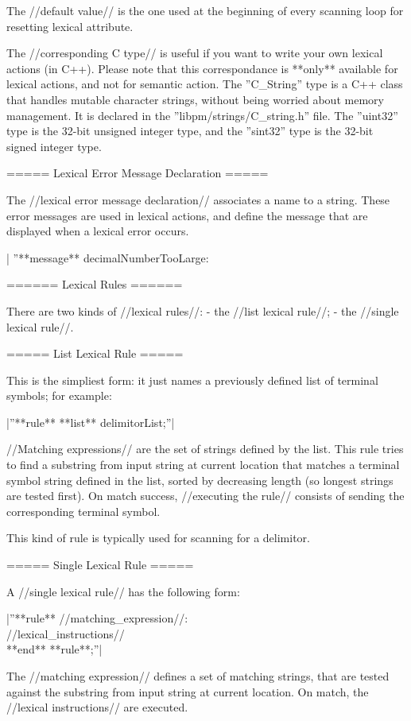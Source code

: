 {The //default value// is the one used at the beginning of every scanning loop for resetting lexical attribute.

The //corresponding C type// is useful if you want to write your own lexical actions (in C++). Please note that this correspondance is **only** available for lexical actions, and not for semantic action. The ''C\_String'' type is a C++ class that handles mutable character strings, without being worried about memory management. It is declared in the ''libpm/strings/C\_string.h'' file. The ''uint32'' type is the 32-bit unsigned integer type, and the ''sint32'' type is the 32-bit signed integer type. 
 

===== Lexical Error Message Declaration =====

The //lexical error message declaration// associates a name to a string. These error messages are used in lexical actions, and define the message that are displayed when a lexical error occurs.

|  ''**message** decimalNumberTooLarge: %

 

====== Lexical Rules ======

There are two kinds of //lexical rules//:
  - the //list lexical rule//;
  - the //single lexical rule//.

===== List Lexical Rule =====

This is the simpliest form: it just names a previously defined list of terminal symbols; for example:

|''**rule** **list** delimitorList;''|

//Matching expressions// are the set of strings defined by the list. This rule tries to find a substring from input string at current location that matches a terminal symbol string defined in the list, sorted by decreasing length (so longest strings are tested first). On match success, //executing the rule// consists of sending the corresponding terminal symbol.

This kind of rule is typically used for scanning for a delimitor.

===== Single Lexical Rule =====

A //single lexical rule// has the following form:

|''**rule** //matching\_expression//:\\  //lexical\_instructions//\\ **end** **rule**;''|

The //matching expression// defines a set of matching strings, that are tested against the substring from input string at current location. On match, the //lexical instructions// are executed.

}
